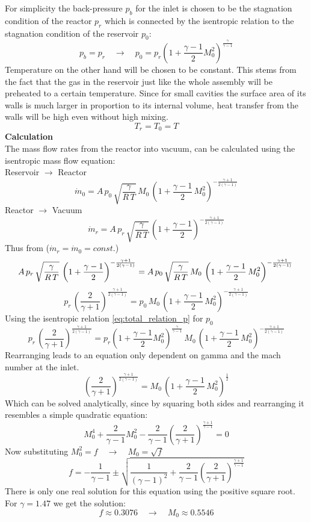 \noindent For simplicity the back-pressure $p_b$ for the inlet is chosen to be the stagnation condition of the reactor $p_r$ which is connected by the isentropic relation to the stagnation condition of the reservoir $p_0$:
$$
	p_b = p_r
	\quad \to \quad
	p_0 = p_r \left(1 + \frac{\gamma - 1}{2}M_0^2 \right)^{\frac{\gamma}{\gamma - 1}}
$$
Temperature on the other hand will be chosen to be constant.
This stems from the fact that the gas in the reservoir just like the whole assembly will be preheated to a certain temperature.
Since for small cavities the surface area of its walls is much larger in proportion to its internal volume, heat transfer from the walls will be high even without high mixing.
$$
	T_r = T_0 = T
$$
\textbf{Calculation}\\
The mass flow rates from the reactor into vacuum, can be calculated using the isentropic mass flow equation:\\
Reservoir $\to$ Reactor
$$
	\dot{m}_0 = A\, p_0\, \sqrt{\frac{\gamma}{R\,T}}\, M_0\,\left(1+\frac{\gamma-1}{2}\,M_0^2\right)^{-\frac{\gamma+1}{2(\gamma-1)}}
$$
Reactor $\to$ Vacuum
$$
	\dot{m}_r = A\, p_r\, \sqrt{\frac{\gamma}{R\,T}}\,\left(1+\frac{\gamma-1}{2}\right)^{-\frac{\gamma+1}{2(\gamma-1)}}
$$
Thus from ($\dot{m}_r = \dot{m}_0 = const.$)
$$
	A\, p_r\, \sqrt{\frac{\gamma}{R\,T}}\,\left(1+\frac{\gamma-1}{2}\right)^{-\frac{\gamma+1}{2(\gamma-1)}}
	=  A\, p_0\, \sqrt{\frac{\gamma}{R\,T}}\, M_0\,\left(1+\frac{\gamma-1}{2}\,M_0^2\right)^{-\frac{\gamma+1}{2(\gamma-1)}}\\\\
$$
$$
	p_r\, \left(\frac{2}{\gamma+1}\right)^{\frac{\gamma+1}{2(\gamma-1)}}
	=  p_0\, M_0\,\left(1+\frac{\gamma-1}{2}\,M_0^2\right)^{-\frac{\gamma+1}{2(\gamma-1)}}
$$
Using the isentropic relation \eqref{eq:total_relation_p} for $p_0$
$$
	p_r\, \left(\frac{2}{\gamma+1}\right)^{\frac{\gamma+1}{2(\gamma-1)}}
	=  p_r \left(1 + \frac{\gamma - 1}{2}M_0^2 \right)^{\frac{\gamma}{\gamma - 1}}\, M_0\,\left(1+\frac{\gamma-1}{2}\,M_0^2\right)^{-\frac{\gamma+1}{2(\gamma-1)}}
$$
Rearranging leads to an equation only dependent on gamma and the mach number at the inlet.
$$
	\left(\frac{2}{\gamma+1}\right)^{\frac{\gamma+1}{2(\gamma-1)}}
	=  M_0\,\left(1+\frac{\gamma-1}{2}\,M_0^2\right)^{\frac{1}{2}}
$$
Which can be solved analytically, since by squaring both sides and rearranging it resembles a simple quadratic equation:
$$
	M_0^4 + \frac{2}{\gamma - 1}M_0^2 - \frac{2}{\gamma -1}\left(\frac{2}{\gamma + 1}\right)^{\frac{\gamma + 1}{\gamma - 1}} = 0
$$
Now substituting $M_0^2 = f \quad \to \quad M_0 = \sqrt{f}$
$$
	f = -\frac{1}{\gamma - 1} \pm \sqrt{\frac{1}{(\gamma - 1)^2}
	+ \frac{2}{\gamma -1}\left(\frac{2}{\gamma + 1}\right)^{\frac{\gamma + 1}{\gamma - 1}}}
$$
There is only one real solution for this equation using the positive square root.
For $\gamma = 1.47$ we get the solution:
$$
	f \approx 0.3076 \quad \to \quad M_0 \approx 0.5546
$$ 
